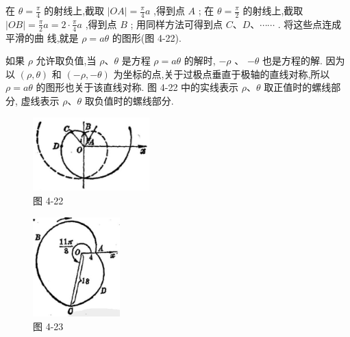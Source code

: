 \documentclass[lang=cn,newtx,10.5pt,scheme=chinese]{elegantbook}
\begin{document}
\begin{center}
\end{center}

在 \(\theta = \frac{\pi }{4}\) 的射线上,截取 \(\left| {OA}\right| = \frac{\pi }{4}a\) ,得到点 \(A\) ; 在 \(\theta = \frac{\pi }{2}\) 的射线上,截取 \(\left| {OB}\right| = \frac{\pi }{2}a = 2 \cdot \frac{\pi }{4}a\) ,得到点 \(B\) ; 用同样方法可得到点 \(C\text{、}D\text{、}\cdots \cdots\) . 将这些点连成平滑的曲 线,就是 \(\rho = {a\theta }\) 的图形(图 4-22).

如果 \(\rho\) 允许取负值,当 \(\rho \text{、}\theta\) 是方程 \(\rho = {a\theta }\) 的解时, \(- \rho\) 、 \(- \theta\) 也是方程的解. 因为以 \(\left( {\rho ,\theta }\right)\) 和 \(\left( {-\rho , - \theta }\right)\) 为坐标的点,关于过极点垂直于极轴的直线对称,所以 \(\rho = {a\theta }\) 的图形也关于该直线对称. 图 4-22 中的实线表示 \(\rho \text{、}\theta\) 取正值时的螺线部分, 虚线表示 \(\rho \text{、}\theta\) 取负值时的螺线部分.

\begin{figure}[h]
  \centering
  \includegraphics[max width=0.4\textwidth]{images/01912cc2-ffb6-728e-9ae7-b113ff05c64b_185_467039.jpg}
  \caption{图 4-22}
\end{figure}



\begin{figure}[h]
  \centering
  \includegraphics[max width=0.3\textwidth]{images/01912cc2-ffb6-728e-9ae7-b113ff05c64b_185_356725.jpg}
  \caption{图 4-23}
\end{figure}
\end{document}
